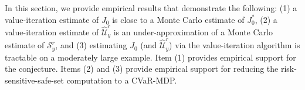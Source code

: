 \documentclass[letterpaper, 10 pt, conference]{ieeeconf}  %
\begin{document}
In this section, we provide empirical results that demonstrate the following: (1) a value-iteration estimate of $J_0$ is close to a Monte Carlo estimate of $J_0^*$,
(2) a value-iteration estimate of $\hat{\mathcal{U}}_y^r$ is an under-approximation of a Monte Carlo estimate of $\mathcal{S}_y^r$, and
(3) estimating $J_0$ (and $\hat{\mathcal{U}}_y^r$) via the value-iteration algorithm is tractable on a moderately large example.
Item (1) provides empirical support for the conjecture. Items (2) and (3) provide empirical support for 
reducing the risk-sensitive-safe-set computation to a CVaR-MDP.
\end{document}

